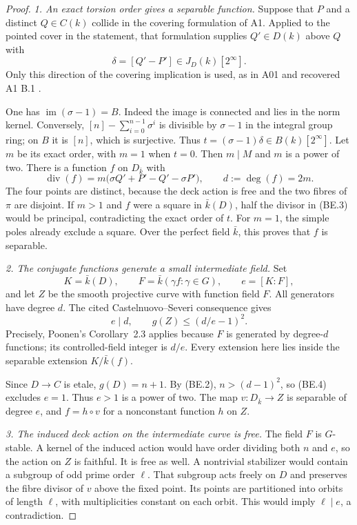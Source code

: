 \documentclass[11pt,a4paper]{article}
\begin{document}
\begin{proof}
\emph{1. An exact torsion order gives a separable function.}
Suppose that $P$ and a distinct $Q\in C(k)$ collide in the
covering formulation of A1. Applied to the pointed cover in the
statement, that formulation supplies $Q'\in D(k)$ above $Q$ with
\[
                    \delta=[Q'-P']\in J_D(k)[2^\infty].
\]
Only this direction of the covering implication is used, as in
A01 and recovered A1 B.1 \cite[B.1]{A1run}.

One has $\operatorname{im}(\sigma-1)=B$.
Indeed the image is connected and lies in the norm kernel.
Conversely, $[n]-\sum_{i=0}^{n-1}\sigma^i$ is divisible by
$\sigma-1$ in the integral group ring; on $B$ it is $[n]$,
which is surjective. Thus
$t=(\sigma-1)\delta\in B(k)[2^\infty]$.
Let $m$ be its exact order, with $m=1$ when $t=0$.
Then $m\mid M$ and $m$ is a power of two. There is a function
$f$ on $D_{\bar k}$ with
\[
 \operatorname{div}(f)
       =m\bigl(\sigma Q'+P'-Q'-\sigma P'\bigr),
                  \qquad d:=\deg(f)=2m.
 \tag{BE.3}
\]
The four points are distinct, because the deck action is free
and the two fibres of $\pi$ are disjoint. If $m>1$ and $f$ were
a square in $\bar k(D)$, half the divisor in (BE.3) would be
principal, contradicting the exact order of $t$. For $m=1$,
the simple poles already exclude a square. Over the perfect
field $\bar k$, this proves that $f$ is separable.

\emph{2. The conjugate functions generate a small intermediate field.}
Set
\[
 K=\bar k(D),\qquad F=\bar k(\gamma f:\gamma\in G),
       \qquad e=[K:F],
\]
and let $Z$ be the smooth projective curve with function field $F$.
All generators have degree $d$. The cited Castelnuovo--Severi
consequence gives
\[
                 e\mid d,\qquad g(Z)\le(d/e-1)^2.
 \tag{BE.4}
\]
Precisely, Poonen's Corollary~2.3 applies because $F$ is
generated by degree-$d$ functions; its controlled-field
integer is $d/e$. Every extension here lies inside the
separable extension $K/\bar k(f)$.

Since $D\to C$ is etale, $g(D)=n+1$.
By (BE.2), $n>(d-1)^2$, so (BE.4) excludes $e=1$.
Thus $e>1$ is a power of two. The map $v:D_{\bar k}\to Z$
is separable of degree $e$, and $f=h\circ v$ for a nonconstant
function $h$ on $Z$.

\emph{3. The induced deck action on the intermediate curve is free.}
The field $F$ is $G$-stable. A kernel of the induced action
would have order dividing both $n$ and $e$, so the action on
$Z$ is faithful. It is free as well. A nontrivial stabilizer
would contain a subgroup of odd prime order $\ell$. That
subgroup acts freely on $D$ and preserves the fibre divisor
of $v$ above the fixed point. Its points are partitioned into
orbits of length $\ell$, with multiplicities constant on each
orbit. This would imply $\ell\mid e$, a contradiction.


\end{proof}
\end{document}
